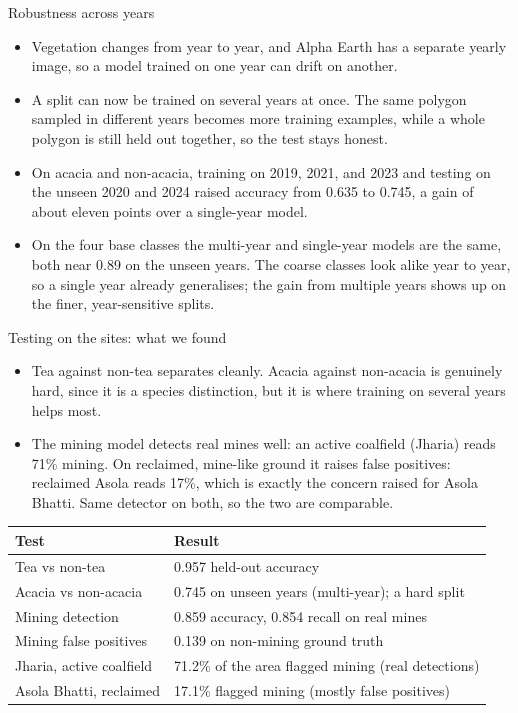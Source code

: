 \documentclass[aspectratio=169]{beamer}
\begin{document}
\begin{frame}{Robustness across years}
\begin{itemize}
  \item Vegetation changes from year to year, and Alpha Earth has a separate yearly image, so a
  model trained on one year can drift on another.
  \item A split can now be trained on several years at once. The same polygon sampled in
  different years becomes more training examples, while a whole polygon is still held out
  together, so the test stays honest.
  \item On acacia and non-acacia, training on 2019, 2021, and 2023 and testing on the unseen
  2020 and 2024 raised accuracy from 0.635 to 0.745, a gain of about eleven points over a
  single-year model.
  \item On the four base classes the multi-year and single-year models are the same, both near
  0.89 on the unseen years. The coarse classes look alike year to year, so a single year already
  generalises; the gain from multiple years shows up on the finer, year-sensitive splits.
\end{itemize}
\end{frame}

\begin{frame}{Testing on the sites: what we found}
\begin{itemize}\small
  \item Tea against non-tea separates cleanly. Acacia against non-acacia is genuinely hard,
  since it is a species distinction, but it is where training on several years helps most.
  \item The mining model detects real mines well: an active coalfield (Jharia) reads 71\% mining.
  On reclaimed, mine-like ground it raises false positives: reclaimed Asola reads 17\%, which is
  exactly the concern raised for Asola Bhatti. Same detector on both, so the two are comparable.
\end{itemize}
\vspace{0.5em}
\centering
\begin{tabular}{ll}
\toprule
Test & Result \\
\midrule
Tea vs non-tea & 0.957 held-out accuracy \\
Acacia vs non-acacia & 0.745 on unseen years (multi-year); a hard split \\
Mining detection & 0.859 accuracy, 0.854 recall on real mines \\
Mining false positives & 0.139 on non-mining ground truth \\
Jharia, active coalfield & 71.2\% of the area flagged mining (real detections) \\
Asola Bhatti, reclaimed & 17.1\% flagged mining (mostly false positives) \\
\bottomrule
\end{tabular}
\end{frame}
\end{document}
